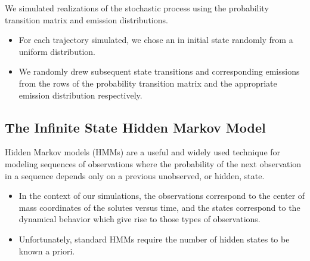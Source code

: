 \documentclass{article}
\begin{document}
  We simulated realizations of the stochastic process using the probability transition
  matrix and emission distributions.
  \begin{itemize}
    \item For each trajectory simulated, we chose an in initial state randomly from a 
    uniform distribution. %
    \item We randomly drew subsequent state transitions and corresponding emissions 
    from the rows of the probability transition matrix and the appropriate emission
    distribution respectively.
  \end{itemize}
  

  \subsection{The Infinite State Hidden Markov Model}\label{method:iHMM}  %
  
  Hidden Markov models (HMMs) are a useful and widely used technique
  for modeling sequences of observations where the probability of the next observation
  in a sequence depends only on a previous unobserved, or hidden, state.~\cite{beal_infinite_2002}
  \begin{itemize}
    \item In the context of our simulations, the observations correspond to 
    the center of mass coordinates of the solutes versus time, and the states
    correspond to the dynamical behavior which give rise to those types
    of observations.
    \item Unfortunately, standard HMMs require the number of hidden states to be known
    a priori.
  \end{itemize}
  
\end{document}
